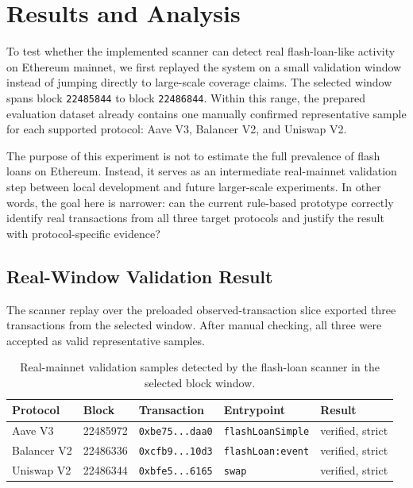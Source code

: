 \section{Results and Analysis}

To test whether the implemented scanner can detect real flash-loan-like activity on Ethereum mainnet, we first replayed the system on a small validation window instead of jumping directly to large-scale coverage claims. The selected window spans block \texttt{22485844} to block \texttt{22486844}. Within this range, the prepared evaluation dataset already contains one manually confirmed representative sample for each supported protocol: Aave V3, Balancer V2, and Uniswap V2.

The purpose of this experiment is not to estimate the full prevalence of flash loans on Ethereum. Instead, it serves as an intermediate real-mainnet validation step between local development and future larger-scale experiments. In other words, the goal here is narrower: can the current rule-based prototype correctly identify real transactions from all three target protocols and justify the result with protocol-specific evidence?

\subsection{Real-Window Validation Result}

The scanner replay over the preloaded observed-transaction slice exported three transactions from the selected window. After manual checking, all three were accepted as valid representative samples.

\begin{table}[H]
    \centering
    \small
    \begin{tabular}{p{} p{} p{} p{} p{}}
        \toprule
        Protocol & Block & Transaction & Entrypoint & Result \\
        \midrule
        Aave V3 & 22485972 & \texttt{0xbe75...daa0} & \texttt{flashLoanSimple} & verified, strict \\
        Balancer V2 & 22486336 & \texttt{0xcfb9...10d3} & \texttt{flashLoan:event} & verified, strict \\
        Uniswap V2 & 22486344 & \texttt{0xbfe5...6165} & \texttt{swap} & verified, strict \\
        \bottomrule
    \end{tabular}
    \caption{Real-mainnet validation samples detected by the flash-loan scanner in the selected block window.}
\end{table}

